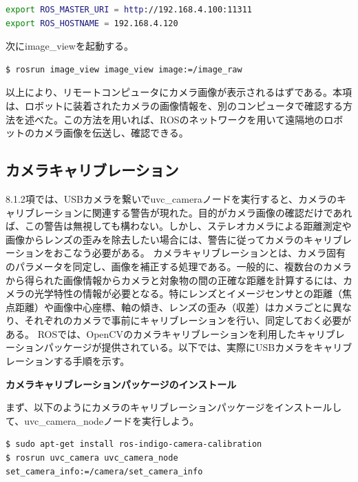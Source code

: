 \begin{lstlisting}[language=bash]
export ROS_MASTER_URI = http://192.168.4.100:11311
export ROS_HOSTNAME = 192.168.4.120
\end{lstlisting}

次にimage\_viewを起動する。

\begin{lstlisting}[language=ROS]
$ rosrun image_view image_view image:=/image_raw
\end{lstlisting}

以上により、リモートコンピュータにカメラ画像が表示されるはずである。本項は、ロボットに装着されたカメラの画像情報を、別のコンピュータで確認する方法を述べた。この方法を用いれば、ROSのネットワークを用いて遠隔地のロボットのカメラ画像を伝送し、確認できる。

\subsection{カメラキャリブレーション}

8.1.2項では、USBカメラを繋いでuvc\_cameraノードを実行すると、カメラのキャリブレーションに関連する警告が現れた。目的がカメラ画像の確認だけであれば、この警告は無視しても構わない。しかし、ステレオカメラによる距離測定や画像からレンズの歪みを除去したい場合には、警告に従ってカメラのキャリブレーションをおこなう必要がある。
カメラキャリブレーションとは、カメラ固有のパラメータを同定し、画像を補正する処理である。一般的に、複数台のカメラから得られた画像情報からカメラと対象物の間の正確な距離を計算するには、カメラの光学特性の情報が必要となる。特にレンズとイメージセンサとの距離（焦点距離）や画像中心座標、軸の傾き、レンズの歪み（収差）はカメラごとに異なり、それぞれのカメラで事前にキャリブレーションを行い、同定しておく必要がある。
ROSでは、OpenCVのカメラキャリブレーションを利用したキャリブレーションパッケージが提供されている。以下では、実際にUSBカメラをキャリブレーションする手順を示す。

\textbf{カメラキャリブレーションパッケージのインストール}

まず、以下のようにカメラのキャリブレーションパッケージをインストールして、uvc\_camera\_nodeノードを実行しよう。

\begin{lstlisting}[language=ROS]
$ sudo apt-get install ros-indigo-camera-calibration
$ rosrun uvc_camera uvc_camera_node set_camera_info:=/camera/set_camera_info
\end{lstlisting}

